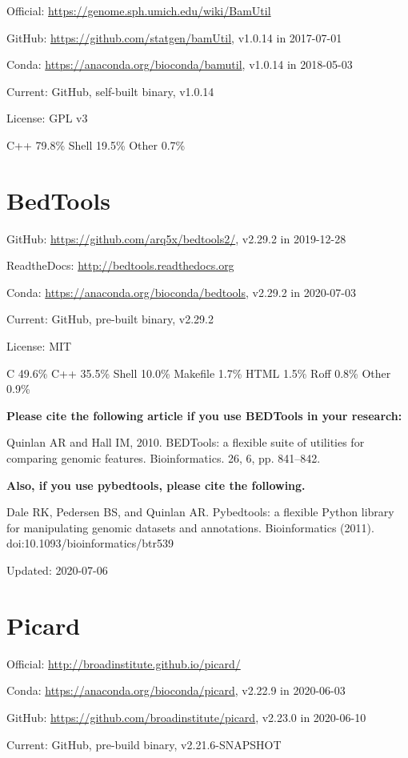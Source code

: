 \documentclass[]{article}
\begin{document}
Official: \url{https://genome.sph.umich.edu/wiki/BamUtil}

GitHub: \url{https://github.com/statgen/bamUtil}, v1.0.14 in 2017-07-01

Conda: \url{https://anaconda.org/bioconda/bamutil}, v1.0.14 in 2018-05-03

Current: GitHub, self-built binary, v1.0.14

License: GPL v3

C++ 79.8\% Shell 19.5\% Other 0.7\%

\section{BedTools}

GitHub: \url{https://github.com/arq5x/bedtools2/}, v2.29.2 in 2019-12-28

ReadtheDocs: \url{http://bedtools.readthedocs.org}

Conda: \url{https://anaconda.org/bioconda/bedtools}, v2.29.2 in 2020-07-03

Current: GitHub, pre-built binary, v2.29.2

License: MIT

C 49.6\% C++ 35.5\% Shell 10.0\% Makefile 1.7\% HTML 1.5\% Roff 0.8\% Other 0.9\%

\textbf{Please cite the following article if you use BEDTools in your research:}

Quinlan AR and Hall IM, 2010. BEDTools: a flexible suite of utilities for comparing genomic features. Bioinformatics. 26, 6, pp. 841–842.

\textbf{Also, if you use pybedtools, please cite the following.}

Dale RK, Pedersen BS, and Quinlan AR. Pybedtools: a flexible Python library for manipulating genomic datasets and annotations. Bioinformatics (2011). doi:10.1093/bioinformatics/btr539

Updated: 2020-07-06

\section{Picard}

Official: \url{http://broadinstitute.github.io/picard/}

Conda: \url{https://anaconda.org/bioconda/picard}, v2.22.9 in 2020-06-03

GitHub: \url{https://github.com/broadinstitute/picard}, v2.23.0 in 2020-06-10

Current: GitHub, pre-build binary, v2.21.6-SNAPSHOT
\end{document}
